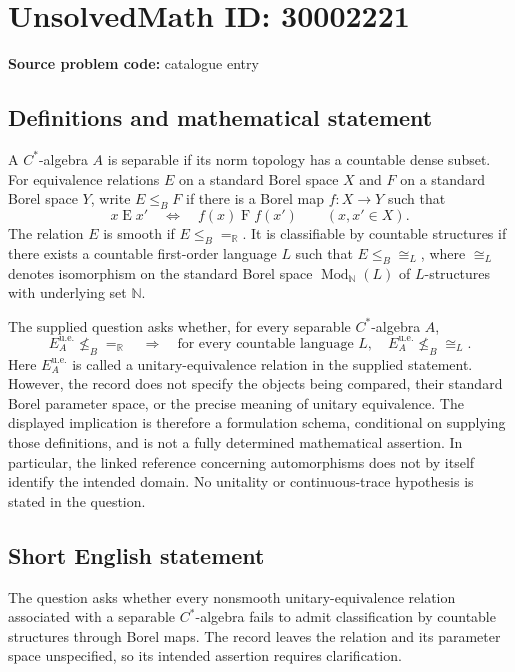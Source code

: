\documentclass[11pt]{article}
\newcommand{\N}{\mathbb{N}}
\newcommand{\R}{\mathbb{R}}
\begin{document}
\section*{UnsolvedMath ID: 30002221}
\textbf{Source problem code:} catalogue entry
\subsection{Definitions and mathematical statement}
A \(C^*\)-algebra \(A\) is separable if its norm topology has a countable dense subset. For equivalence relations \(E\) on a standard Borel space \(X\) and \(F\) on a standard Borel space \(Y\), write \(E\leq_B F\) if there is a Borel map \(f:X\to Y\) such that
\[
 x\mathrel{E}x'\quad\Longleftrightarrow\quad f(x)\mathrel{F}f(x')
 \qquad(x,x'\in X).
\]
The relation \(E\) is smooth if \(E\leq_B {=}_{\R}\). It is classifiable by countable structures if there exists a countable first-order language \(L\) such that \(E\leq_B\cong_L\), where \(\cong_L\) denotes isomorphism on the standard Borel space \(\operatorname{Mod}_{\N}(L)\) of \(L\)-structures with underlying set \(\N\).

The supplied question asks whether, for every separable \(C^*\)-algebra \(A\),
\[
 E_A^{\mathrm{u.e.}}\not\leq_B {=}_{\R}
 \quad\Longrightarrow\quad
 \text{for every countable language }L,\quad
 E_A^{\mathrm{u.e.}}\not\leq_B\cong_L.
\]
Here \(E_A^{\mathrm{u.e.}}\) is called a unitary-equivalence relation in the supplied statement. However, the record does not specify the objects being compared, their standard Borel parameter space, or the precise meaning of unitary equivalence. The displayed implication is therefore a formulation schema, conditional on supplying those definitions, and is not a fully determined mathematical assertion. In particular, the linked reference concerning automorphisms does not by itself identify the intended domain. No unitality or continuous-trace hypothesis is stated in the question.
\subsection{Short English statement}
The question asks whether every nonsmooth unitary-equivalence relation associated with a separable \(C^*\)-algebra fails to admit classification by countable structures through Borel maps. The record leaves the relation and its parameter space unspecified, so its intended assertion requires clarification.
\end{document}
